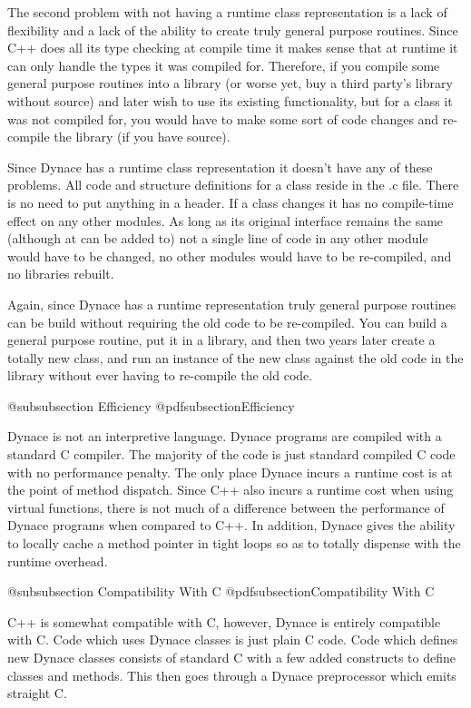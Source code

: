 The second problem with not having a runtime class representation is a
lack of flexibility and a lack of the ability to create truly general
purpose routines.  Since C++ does all its type checking at compile time
it makes sense that at runtime it can only handle the types it was
compiled for.  Therefore, if you compile some general purpose routines
into a library (or worse yet, buy a third party's library without source)
and later wish to use its existing functionality, but for a class it was
not compiled for, you would have to make some sort of code changes and
re-compile the library (if you have source).

Since Dynace has a runtime class representation it doesn't have any of
these problems.  All code and structure definitions for a class reside
in the .c file.  There is no need to put anything in a header.  If a
class changes it has no compile-time effect on any other modules.  As
long as its original interface remains the same (although at can be
added to) not a single line of code in any other module would have to
be changed, no other modules would have to be re-compiled, and no
libraries rebuilt.

Again, since Dynace has a runtime representation truly general purpose
routines can be build without requiring the old code to be
re-compiled.  You can build a general purpose routine, put it in a
library, and then two years later create a totally new class, and run
an instance of the new class against the old code in the library
without ever having to re-compile the old code.

@subsubsection Efficiency
@pdfsubsection{Efficiency}


Dynace is not an interpretive language. Dynace programs are compiled with a
standard C compiler.  The majority of the code is just standard compiled
C code with no performance penalty.  The only place Dynace incurs a runtime
cost is at the point of method dispatch.  Since C++ also incurs a runtime
cost when using virtual functions, there is not much of a difference
between the performance of Dynace programs when compared to C++.  In addition,
Dynace gives the ability to locally cache a method pointer in tight loops so
as to totally dispense with the runtime overhead.


@subsubsection Compatibility With C
@pdfsubsection{Compatibility With C}

C++ is somewhat compatible with C, however, Dynace is entirely
compatible with C.  Code which uses Dynace classes is just plain C
code.  Code which defines new Dynace classes consists of standard C
with a few added constructs to define classes and methods.  This then
goes through a Dynace preprocessor which emits straight C.

